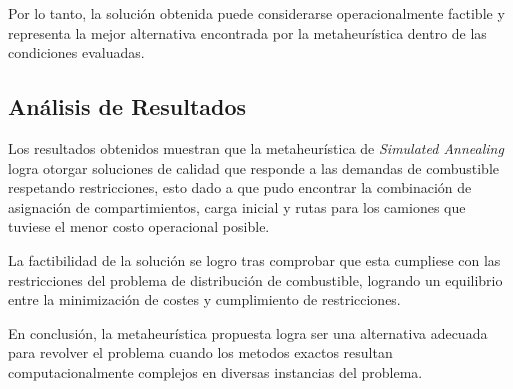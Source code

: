 Por lo tanto, la solución obtenida puede considerarse operacionalmente factible y representa la mejor alternativa encontrada por la metaheurística dentro de las condiciones evaluadas.

\subsection{Análisis de Resultados}

Los resultados obtenidos muestran que la metaheurística de \textit{Simulated Annealing} logra otorgar soluciones de calidad que responde a las demandas de combustible respetando restricciones, esto dado a que pudo encontrar la combinación de asignación de compartimientos, carga inicial y rutas para los camiones que tuviese el menor costo operacional posible.

La factibilidad de la solución se logro tras comprobar que esta cumpliese con las restricciones del problema de distribución de combustible, logrando un equilibrio entre la minimización de costes y cumplimiento de restricciones.

En conclusión, la metaheurística propuesta logra ser una alternativa adecuada para revolver el problema cuando los metodos exactos resultan computacionalmente complejos en diversas instancias del problema.
